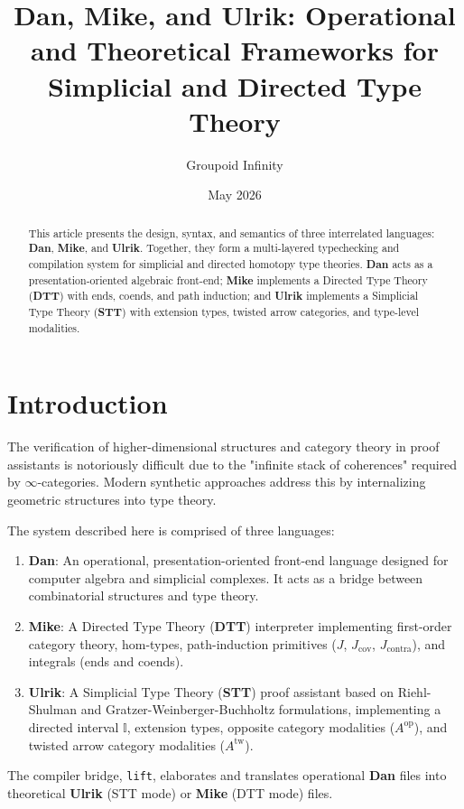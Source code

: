 \documentclass[11pt]{article}
\title{Dan, Mike, and Ulrik: Operational and Theoretical Frameworks for Simplicial and Directed Type Theory}
\author{Groupoid Infinity}
\date{May 2026}
\newcommand{\dan}[0]{\textbf{Dan}}
\newcommand{\mike}[0]{\textbf{Mike}}
\newcommand{\ulrik}[0]{\textbf{Ulrik}}
\newcommand{\stt}[0]{\textbf{STT}}
\newcommand{\dtt}[0]{\textbf{DTT}}
\newcommand{\op}[0]{^\text{op}}
\begin{document}
\maketitle

\begin{abstract}
This article presents the design, syntax, and semantics of three interrelated languages: \dan{}, \mike{}, and \ulrik{}. Together, they form a multi-layered typechecking and compilation system for simplicial and directed homotopy type theories. \dan{} acts as a presentation-oriented algebraic front-end; \mike{} implements a Directed Type Theory (\dtt{}) with ends, coends, and path induction; and \ulrik{} implements a Simplicial Type Theory (\stt{}) with extension types, twisted arrow categories, and type-level modalities.
\end{abstract}

\newpage
\tableofcontents
\newpage

\section{Introduction}

The verification of higher-dimensional structures and category theory in proof assistants is notoriously difficult due to the "infinite stack of coherences" required by $\infty$-categories. Modern synthetic approaches address this by internalizing geometric structures into type theory. 

The system described here is comprised of three languages:
\begin{enumerate}
    \item \textbf{\dan{}}: An operational, presentation-oriented front-end language designed for computer algebra and simplicial complexes. It acts as a bridge between combinatorial structures and type theory.
    \item \textbf{\mike{}}: A Directed Type Theory (\dtt{}) interpreter implementing first-order category theory, hom-types, path-induction primitives ($J$, $J_\text{cov}$, $J_\text{contra}$), and integrals (ends and coends).
    \item \textbf{\ulrik{}}: A Simplicial Type Theory (\stt{}) proof assistant based on Riehl-Shulman and Gratzer-Weinberger-Buchholtz formulations, implementing a directed interval $\mathbb{I}$, extension types, opposite category modalities ($A\op$), and twisted arrow category modalities ($A^\text{tw}$).
\end{enumerate}

The compiler bridge, \texttt{lift}, elaborates and translates operational \dan{} files into theoretical \ulrik{} (STT mode) or \mike{} (DTT mode) files.
\end{document}
